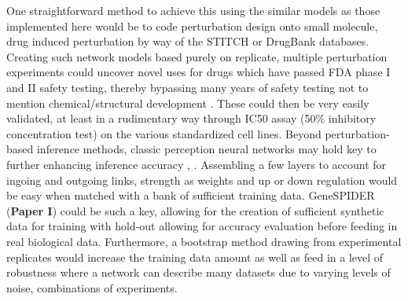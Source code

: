 One straightforward method to achieve this using the similar models as those implemented here would be to code perturbation design onto small molecule, drug induced perturbation by way of the STITCH  \citep{kuhn2009stitch} or DrugBank \citep{wishart2006drugbank} databases. Creating such network models based purely on replicate, multiple perturbation experiments could uncover novel uses for drugs which have passed FDA phase I and II safety testing, thereby bypassing many years of safety testing not to mention chemical/structural development \citep{oprea2011drug}. These could then be very easily validated, at least in a rudimentary way through IC50 assay (50\% inhibitory concentration test) on the various standardized cell lines.
Beyond perturbation-based inference methods, classic perception neural networks may hold key to further enhancing inference accuracy \citep{grimaldi2011regnann}, \citep{hache2007reconstruction}. Assembling a few layers to account for ingoing and outgoing links, strength as weights and up or down regulation would be easy when matched with a bank of sufficient training data. GeneSPIDER (\textbf{Paper I}) could be such a key, allowing for the creation of sufficient synthetic data for training with hold-out allowing for accuracy evaluation before feeding in real biological data. Furthermore, a bootstrap method drawing from experimental replicates would increase the training data amount as well as feed in a level of robustness where a network can describe many datasets due to varying levels of noise, combinations of experiments.

\noindent\hrulefill

